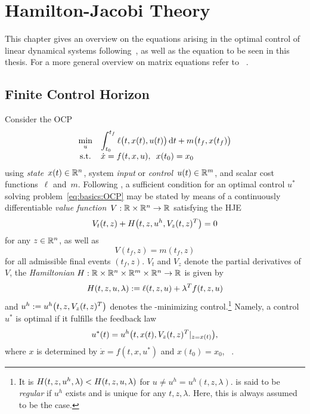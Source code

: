 \chapter{Hamilton-Jacobi Theory}
\label{sec:HJT}

This chapter gives an overview on the \Riccati equations arising in the optimal control
of linear dynamical systems following~\cite{Locatelli2011},
as well as the \Lyapunov equation to be seen in this thesis.
For a more general overview on matrix equations refer to \eg~\cite{Simoncini2016}.

\section{Finite Control Horizon}
\label{sec:basics:HJT}

Consider the \ac{OCP}
\begin{equation}
  \everymath{\displaystyle}
  \begin{array}{cl}
    \min_u & \int_{t_0}^{t_f} \ell\big(t, x(t), u(t)\big) \dt + m\big(t_f, x(t_f)\big) \\
    \text{s.t.} & \dot{x} = f(t,x,u), \enspace x(t_0) = x_0
  \end{array}
  \label{eq:basics:OCP}
\end{equation}
using \emph{state}~$x(t)\in\mathbb{R}^n$, system \emph{input} or \emph{control}~$u(t)\in\mathbb{R}^m$,
and scalar cost functions~$\ell$ and~$m$.
Following \cite{Locatelli2011},
a sufficient condition for
an optimal control $u^*$ solving problem~\eqref{eq:basics:OCP} may be stated by means of a
continuously differentiable
\emph{value function}~$V:\mathbb{R}\times\mathbb{R}^n\to\mathbb{R}$ satisfying the \ac{HJE}
\begin{equation}
  V_t(t,z) + H\big(t,z,u^h,V_z(t,z)^T \big) = 0
  \label{eq:basics:HJE}
\end{equation}
for any $z\in\mathbb{R}^n$,
as well as
\begin{equation}
  V(t_f,z) = m(t_f,z)
  \label{eq:basics:HJE:condition}
\end{equation}
for all admissible final events $(t_f,z)$.
$V_t$ and $V_z$ denote the partial derivatives of $V$,
the \emph{Hamiltonian} $H:\mathbb{R}\times\mathbb{R}^n\times\mathbb{R}^m\times\mathbb{R}^n\to\mathbb{R}$ is given by
\begin{equation}
\label{eq:basics:Hamiltonian}
  H(t,z,u,\lambda) := \ell(t,z,u) + \lambda^T f(t,z,u)
\end{equation}
and $u^h := u^h\big(t,z,V_z(t, z)^T\big)$ denotes the \Ham-minimizing control.\footnote{%
  It is $H(t, z, u^h, \lambda) < H(t, z, u, \lambda)$ for $u \neq u^h = u^h(t, z, \lambda)$.
  \Ham{} is said to be \emph{regular} if $u^h$ exists and is unique for any $t, z, \lambda$.
  Here, this is always assumed to be the case.
}
Namely, a control $u^*$ is optimal if it fulfills the feedback law
\begin{equation}
\label{eq:basics:HJ:feedback}
  u^*(t) = u^h\big(t, x(t), V_z(t,z)^T |_{z=x(t)} \big)
  ,
\end{equation}
where $x$ is determined by $\dot x = f(t, x, u^*)$ and $x(t_0) = x_0$,
\cf~\cite[Corollary~2.1]{Locatelli2011}.

